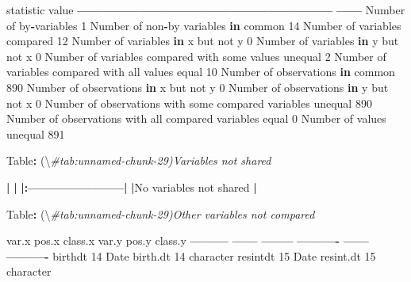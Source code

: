 \documentclass[
]{book}
\newenvironment{Shaded}{\begin{snugshade}}{\end{snugshade}}
\newcommand{\CommentTok}[1]{\textcolor[rgb]{0.56,0.35,0.01}{\textit{#1}}}
\newcommand{\ControlFlowTok}[1]{\textcolor[rgb]{0.13,0.29,0.53}{\textbf{#1}}}
\newcommand{\DecValTok}[1]{\textcolor[rgb]{0.00,0.00,0.81}{#1}}
\newcommand{\ErrorTok}[1]{\textcolor[rgb]{0.64,0.00,0.00}{\textbf{#1}}}
\newcommand{\NormalTok}[1]{#1}
\newcommand{\OperatorTok}[1]{\textcolor[rgb]{0.81,0.36,0.00}{\textbf{#1}}}
\newcommand{\StringTok}[1]{\textcolor[rgb]{0.31,0.60,0.02}{#1}}
\begin{document}
\begin{Shaded}
\begin{Highlighting}[]
\NormalTok{statistic                                                      value}
\OperatorTok{------------------------------------------------------------}\StringTok{  }\OperatorTok{------}
\NormalTok{Number of by}\OperatorTok{-}\NormalTok{variables                                             }\DecValTok{1}
\NormalTok{Number of non}\OperatorTok{-}\NormalTok{by variables }\ControlFlowTok{in}\NormalTok{ common                              }\DecValTok{14}
\NormalTok{Number of variables compared                                      }\DecValTok{12}
\NormalTok{Number of variables }\ControlFlowTok{in}\NormalTok{ x but not y                                 }\DecValTok{0}
\NormalTok{Number of variables }\ControlFlowTok{in}\NormalTok{ y but not x                                 }\DecValTok{0}
\NormalTok{Number of variables compared with some values unequal              }\DecValTok{2}
\NormalTok{Number of variables compared with all values equal                }\DecValTok{10}
\NormalTok{Number of observations }\ControlFlowTok{in}\NormalTok{ common                                 }\DecValTok{890}
\NormalTok{Number of observations }\ControlFlowTok{in}\NormalTok{ x but not y                              }\DecValTok{0}
\NormalTok{Number of observations }\ControlFlowTok{in}\NormalTok{ y but not x                              }\DecValTok{0}
\NormalTok{Number of observations with some compared variables unequal      }\DecValTok{890}
\NormalTok{Number of observations with all compared variables equal           }\DecValTok{0}
\NormalTok{Number of values unequal                                         }\DecValTok{891}



\NormalTok{Table}\OperatorTok{:}\StringTok{ }\NormalTok{(\textbackslash{}}\CommentTok{#tab:unnamed-chunk-29)Variables not shared}

\OperatorTok{|}\StringTok{                        }\ErrorTok{|}
\ErrorTok{|:}\OperatorTok{-----------------------}\ErrorTok{|}
\ErrorTok{|}\NormalTok{No variables not shared }\OperatorTok{|}



\NormalTok{Table}\OperatorTok{:}\StringTok{ }\NormalTok{(\textbackslash{}}\CommentTok{#tab:unnamed-chunk-29)Other variables not compared}

\NormalTok{var.x       pos.x  class.x   var.y        pos.y  class.y   }
\OperatorTok{---------}\StringTok{  }\OperatorTok{------}\StringTok{  }\OperatorTok{--------}\StringTok{  }\OperatorTok{----------}\StringTok{  }\OperatorTok{------}\StringTok{  }\OperatorTok{----------}
\NormalTok{birthdt        }\DecValTok{14}\NormalTok{  Date      birth.dt        }\DecValTok{14}\NormalTok{  character }
\NormalTok{resintdt       }\DecValTok{15}\NormalTok{  Date      resint.dt       }\DecValTok{15}\NormalTok{  character }




\end{Highlighting}
\end{Shaded}
\end{document}
